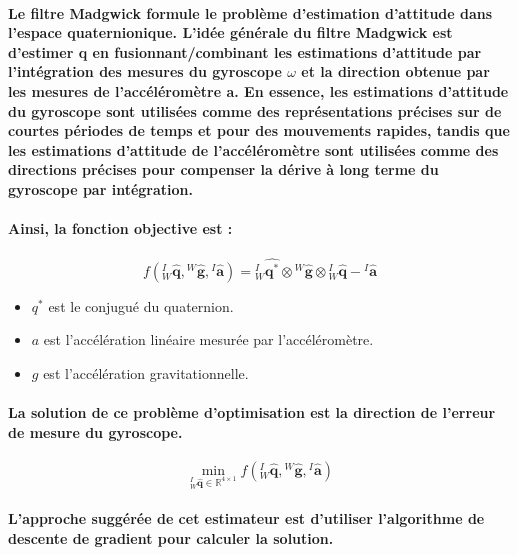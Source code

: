 \paragraph{Le filtre Madgwick formule le problème d'estimation d'attitude dans l'espace quaternionique. L'idée générale du filtre Madgwick est d'estimer q en fusionnant/combinant les estimations d'attitude par l'intégration des mesures du gyroscope $\omega$ et la direction obtenue par les mesures de l'accéléromètre a. En essence, les estimations d'attitude du gyroscope sont utilisées comme des représentations précises sur de courtes périodes de temps et pour des mouvements rapides, tandis que les estimations d'attitude de l'accéléromètre sont utilisées comme des directions précises pour compenser la dérive à long terme du gyroscope par intégration.}

\paragraph{Ainsi, la fonction objective est :}
\begin{equation}
	f\left({}^{I}_{W}\mathbf{\hat{q}}, {}^{W}\mathbf{\hat{g}}, {}^{I}\mathbf{\hat{a}}  \right)  = {}^{I}_{W}\mathbf{\hat{q^*}} \otimes {}^{W}\mathbf{\hat{g}} \otimes {}^{I}_{W}\mathbf{\hat{q}} - {}^{I}\mathbf{\hat{a}}
\end{equation}

\begin{itemize}
	\item $q^*$ est le conjugué du quaternion.
	\item $a$ est l'accélération linéaire mesurée par l'accéléromètre.
	\item $g$ est l'accélération gravitationnelle.
\end{itemize}

\paragraph{La solution de ce problème d'optimisation est la direction de l'erreur de mesure du gyroscope.}

\begin{equation}
	\min_{{}^{I}_{W}\mathbf{\hat{q}} \in \mathbb{R}^{4 \times 1} } f\left({}^{I}_{W}\mathbf{\hat{q}}, {}^{W}\mathbf{\hat{g}}, {}^{I}\mathbf{\hat{a}} \right)
\end{equation}

\paragraph{L'approche suggérée de cet estimateur est d'utiliser l'algorithme de descente de gradient pour calculer la solution.}

